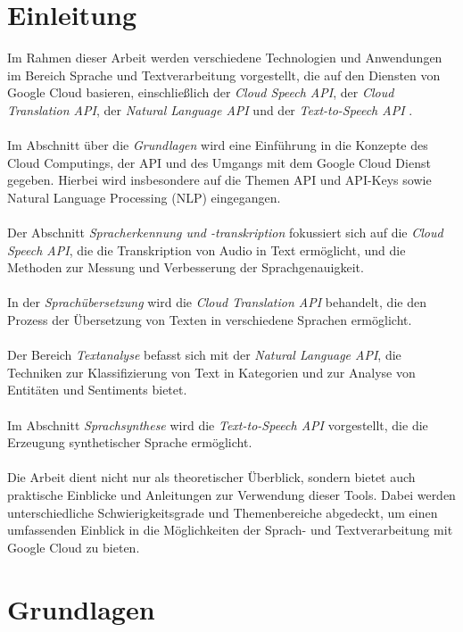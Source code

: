 \documentclass[12pt,a4paper]{article}
\begin{document}
\section*{Einleitung}
Im Rahmen dieser Arbeit werden verschiedene Technologien und Anwendungen im Bereich Sprache und Textverarbeitung vorgestellt, die auf den Diensten von Google Cloud basieren, einschließlich der \textit{Cloud Speech API}, der \textit{Cloud Translation API}, der \textit{Natural Language API} und der \textit{Text-to-Speech API} \cite{google}.
\\ \\
Im Abschnitt über die \textit{Grundlagen} wird eine Einführung in die Konzepte des Cloud Computings, der API und des Umgangs mit dem Google Cloud Dienst gegeben. Hierbei wird insbesondere auf die Themen API und API-Keys sowie Natural Language Processing (NLP) eingegangen.
\\ \\
Der Abschnitt \textit{Spracherkennung und -transkription} fokussiert sich auf die \textit{Cloud Speech API}, die die Transkription von Audio in Text ermöglicht, und die Methoden zur Messung und Verbesserung der Sprachgenauigkeit.
\\ \\
In der \textit{Sprachübersetzung} wird die \textit{Cloud Translation API} behandelt, die den Prozess der Übersetzung von Texten in verschiedene Sprachen ermöglicht.
\\ \\
Der Bereich \textit{Textanalyse} befasst sich mit der \textit{Natural Language API}, die Techniken zur Klassifizierung von Text in Kategorien und zur Analyse von Entitäten und Sentiments bietet.
\\ \\
Im Abschnitt \textit{Sprachsynthese} wird die \textit{Text-to-Speech API} vorgestellt, die die Erzeugung synthetischer Sprache ermöglicht.
\\ \\
Die Arbeit dient nicht nur als theoretischer Überblick, sondern bietet auch praktische Einblicke und Anleitungen zur Verwendung dieser Tools. Dabei werden unterschiedliche Schwierigkeitsgrade und Themenbereiche abgedeckt, um einen umfassenden Einblick in die Möglichkeiten der Sprach- und Textverarbeitung mit Google Cloud zu bieten.

	
\newpage
\section{Grundlagen}
\end{document}
